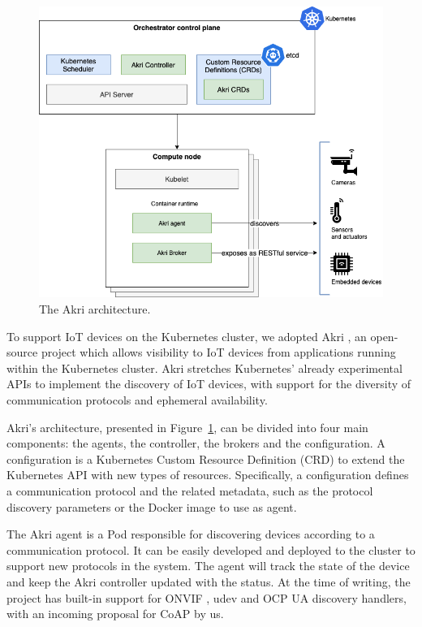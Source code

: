 \begin{figure}[ht]
\centering
\includegraphics[width=\columnwidth]{figures/akri}
\caption{The Akri architecture.}
\label{fig:akri}
\end{figure}

To support IoT devices on the Kubernetes cluster, we adopted Akri \cite{akri}, an open-source project which allows visibility to IoT devices from applications running within the Kubernetes cluster. Akri stretches Kubernetes' already experimental APIs to implement the discovery of IoT devices, with support for the diversity of communication protocols and ephemeral availability.

Akri's architecture, presented in Figure~\ref{fig:akri}, can be divided into four main components: the agents, the controller, the brokers and the configuration. A configuration is a Kubernetes Custom Resource Definition (CRD) to extend the Kubernetes API with new types of resources. Specifically, a configuration defines a communication protocol and the related metadata, such as the protocol discovery parameters or the Docker image to use as agent.

The Akri agent is a Pod responsible for discovering devices according to a communication protocol. It can be easily developed and deployed to the cluster to support new protocols in the system. The agent will track the state of the device and keep the Akri controller updated with the status. At the time of writing, the project has built-in support for ONVIF \cite{onvif}, udev \cite{udev} and OCP UA \cite{gruner2016restful} discovery handlers, with an incoming proposal for CoAP \cite{bormann2012coap} by us.


